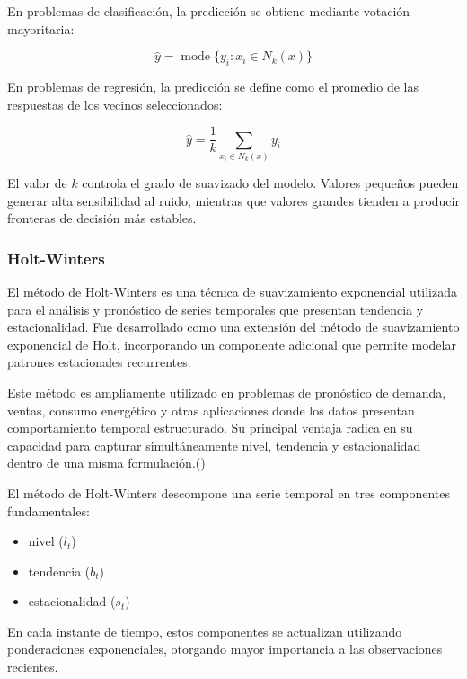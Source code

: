 En problemas de clasificación, la predicción se obtiene mediante votación mayoritaria:

\begin{equation}
	\hat{y} = \operatorname{mode}\{y_i : x_i \in N_k(x)\}
\end{equation}

En problemas de regresión, la predicción se define como el promedio de las respuestas de los vecinos seleccionados:

\begin{equation}
	\hat{y} = \frac{1}{k} \sum_{x_i \in N_k(x)} y_i
\end{equation}

El valor de $k$ controla el grado de suavizado del modelo. Valores pequeños pueden generar alta sensibilidad al ruido, mientras que valores grandes tienden a producir fronteras de decisión más estables.



\subsubsection{Holt-Winters}

El método de Holt-Winters es una técnica de suavizamiento exponencial utilizada para el análisis y pronóstico de series temporales que presentan tendencia y estacionalidad. Fue desarrollado como una extensión del método de suavizamiento exponencial de Holt, incorporando un componente adicional que permite modelar patrones estacionales recurrentes.

Este método es ampliamente utilizado en problemas de pronóstico de demanda, ventas, consumo energético y otras aplicaciones donde los datos presentan comportamiento temporal estructurado. Su principal ventaja radica en su capacidad para capturar simultáneamente nivel, tendencia y estacionalidad dentro de una misma formulación.(\cite{hyndman2018forecastingHW})


El método de Holt-Winters descompone una serie temporal en tres componentes fundamentales:

\begin{itemize}
	\item nivel (\(l_t\))
	\item tendencia (\(b_t\))
	\item estacionalidad (\(s_t\))
\end{itemize}

En cada instante de tiempo, estos componentes se actualizan utilizando ponderaciones exponenciales, otorgando mayor importancia a las observaciones recientes.

